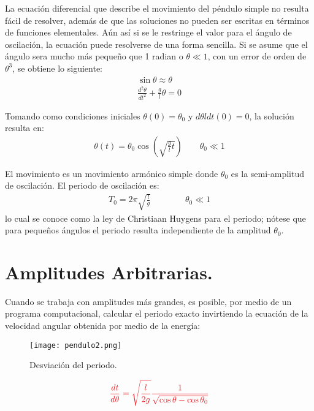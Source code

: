 \documentclass[12pt]{article}
\begin{document}
La ecuación diferencial que describe el movimiento del péndulo simple no resulta fácil de resolver, además de que las soluciones no pueden ser escritas en términos de funciones elementales. Aún así si se le restringe el valor para el ángulo de oscilación, la ecuación puede resolverse de una forma sencilla. Si se asume que el ángulo sera mucho más pequeño que 1 radian o $\theta \ll 1 $, con un error de orden de $\theta ^3$, se obtiene lo siguiente:
\begin{eqnarray*}
\sin \theta \approx \theta \\
\frac{d^2 \theta}{dt^2} + \frac{g}{l}\theta = 0
\end{eqnarray*}

Tomando como condiciones iniciales $\theta (0) = \theta_0$ y $d\theta l dt(0) = 0$, la solución resulta en:
\begin{eqnarray*}
\theta(t) = \theta_0 \cos \left( \sqrt{\frac{g}{l}t} \right)  \qquad \theta_0 \ll 1 
\end{eqnarray*}

El movimiento es un movimiento armónico simple donde $\theta_0$ es la semi-amplitud de oscilación. El periodo de oscilación es:
\begin{eqnarray*}
T_0 = 2\pi \sqrt{\frac{l}{g}}  \qquad   \qquad  \theta_0 \ll 1
\end{eqnarray*}
lo cual se conoce como la ley de Christiaan Huygens para el periodo; nótese que para pequeños ángulos el periodo resulta independiente de la amplitud $\theta_0$.


\pagebreak
\section{Amplitudes Arbitrarias.}

Cuando se trabaja con amplitudes más grandes, es posible, por medio de un programa computacional, calcular el periodo exacto invirtiendo la ecuación de la velocidad angular obtenida por medio de la energía:
\begin{wrapfigure}{r}{7cm}
	\begin{center}
      \texttt{[image: pendulo2.png]}
      \caption{Desviación del periodo\cite{Img2}.}
    \end{center}
\end{wrapfigure}
\begin{equation}
\textcolor{Red}{\frac{dt}{d \theta} = \sqrt{\frac{l}{2g}} \frac{1}{\sqrt{\cos\theta -  \cos\theta_0}}}
\end{equation}
\end{document}
